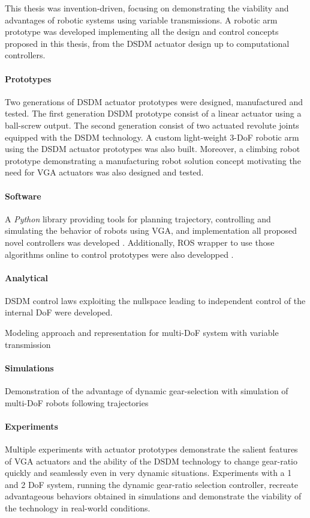This thesis was invention-driven, focusing on demonstrating the viability and advantages of robotic systems using variable transmissions. A robotic arm prototype was developed implementing all the design and control concepts proposed in this thesis, from the DSDM actuator design up to computational controllers. 

\paragraph{Prototypes}
%
Two generations of DSDM actuator prototypes were designed, manufactured and tested. The first generation DSDM prototype consist of a linear actuator using a ball-screw output. The second generation consist of two actuated revolute joints equipped with the DSDM technology. A custom light-weight 3-DoF robotic arm using the DSDM actuator prototypes was also built. Moreover, a climbing robot prototype demonstrating a manufacturing robot solution concept motivating the need for VGA actuators was also designed and tested.

\paragraph{Software}
%
A \emph{Python} library providing tools for planning trajectory, controlling and simulating the behavior of robots using VGA, and implementation all proposed novel controllers was developed \cite{girard_alx87grd/alexrobotics_????}. Additionally, ROS wrapper to use those algorithms online to control prototypes were also developped \cite{girard_alx87grd/dsdm_robotics_ros_????}.


\paragraph{Analytical}
%
DSDM control laws exploiting the nullspace leading to independent control of the internal DoF were developed. 

Modeling approach and representation for multi-DoF system with variable transmission


\paragraph{Simulations}
%
Demonstration of the advantage of dynamic gear-selection with simulation of multi-DoF robots following trajectories 


\paragraph{Experiments}
%
Multiple experiments with actuator prototypes demonstrate the salient features of VGA actuators and the ability of the DSDM technology to change gear-ratio quickly and seamlessly even in very dynamic situations. Experiments with a 1 and 2 DoF system, running the dynamic gear-ratio selection controller, recreate advantageous behaviors obtained in simulations and demonstrate the viability of the technology in real-world conditions.



